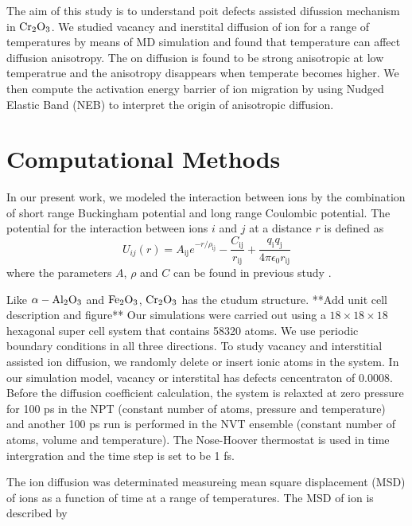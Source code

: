 \documentclass[twocolumn,showpacs,preprintnumbers,amsmath,amssymb,superscriptaddress,prb]{revtex4}
\begin{document}
The aim of this study is to understand poit defects assisted difussion mechanism in $\textup{Cr}_2\textup{O}_3$. We studied vacancy and inerstital diffusion of ion for a range of temperatures by means of MD simulation and found that temperature can affect  diffusion anisotropy. The on diffusion is found to be strong anisotropic at low temperatrue and the anisotropy disappears when temperate becomes higher. We then compute the activation energy barrier of ion migration by using Nudged Elastic Band (NEB) to interpret the origin of anisotropic diffusion.    


\section{Computational Methods}
	
		In our present work, we modeled the interaction between ions by the combination of short range Buckingham potential and long range Coulombic potential. The potential for the interaction between ions $i$ and $j$ at a distance $r$ is defined as
		\begin{equation}
					U_{ij}(r) = A_{\text{ij}}e^{-r/\rho_{\text{ij}}} - \frac{C_{\text{ij}}}{r_{\text{ij}}} + \frac{q_\text{i}q_\text{j}}{4\pi\epsilon_0r_{\text{ij}}} 
		\end{equation}
		where the parameters $A$, $\rho$ and $C$ can be found in previous study \cite{---CITEpaper}. 
\par Like $\alpha - \textup{Al}_2\textup{O}_3$ and $\textup{Fe}_2\textup{O}_3$, $\textup{Cr}_2\textup{O}_3$ has the ctudum structure. **Add unit cell description and figure** Our simulations were carried out using a  $18\times18\times18$ hexagonal super cell system that contains 58320 atoms. We use periodic boundary conditions in all three directions. To study vacancy and interstitial assisted ion diffusion, we randomly delete or insert ionic atoms in the system. In our simulation model, vacancy or interstital has defects cencentraton of 0.0008. Before the diffusion coefficient calculation, the system is relaxted at zero pressure for 100 ps in the NPT (constant number of atoms, pressure and temperature) and another 100 ps run is performed in the NVT ensemble (constant number of atoms, volume and temperature). The Nose-Hoover thermostat is used in time intergration and the time step is set to be 1 fs. 
\par The ion diffusion was determinated measureing mean square displacement (MSD) of ions as a function of time at a range of temperatures. The MSD of ion is described by
\end{document}
